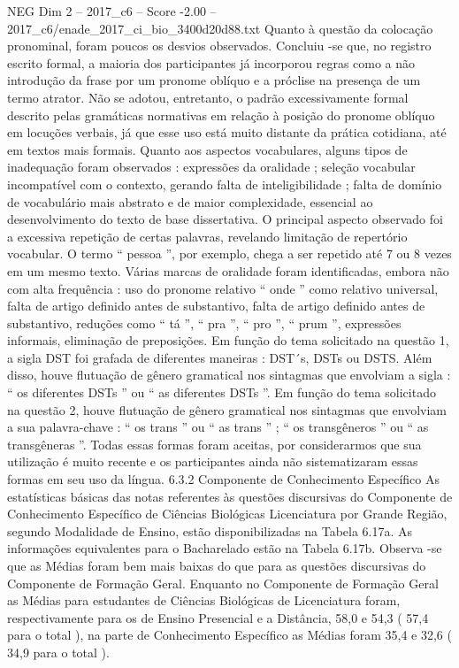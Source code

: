 \begin{textsample}{NEG Dim 2 – 2017\_c6 – Score -2.00 – 2017\_c6/enade\_2017\_ci\_bio\_3400d20d88.txt}
Quanto à questão da colocação pronominal, foram poucos os desvios observados.
Concluiu -se que, no registro escrito formal, a maioria dos participantes já incorporou regras como a não introdução da frase por um pronome oblíquo e a próclise na presença de um termo atrator.
Não se adotou, entretanto, o padrão excessivamente formal descrito pelas gramáticas normativas em relação à posição do pronome oblíquo em locuções verbais, já que esse uso está muito distante da prática cotidiana, até em textos mais formais.
Quanto aos aspectos vocabulares, alguns tipos de inadequação foram observados : expressões da oralidade ; seleção vocabular incompatível com o contexto, gerando falta de inteligibilidade ; falta de domínio de vocabulário mais abstrato e de maior complexidade, essencial ao desenvolvimento do texto de base dissertativa.
O principal aspecto observado foi a excessiva repetição de certas palavras, revelando limitação de repertório vocabular.
O termo “ pessoa ”, por exemplo, chega a ser repetido até 7 ou 8 vezes em um mesmo texto.
Várias marcas de oralidade foram identificadas, embora não com alta frequência : uso do pronome relativo “ onde ” como relativo universal, falta de artigo definido antes de substantivo, falta de artigo definido antes de substantivo, reduções como “ tá ”, “ pra ”, “ pro ”, “ prum ”, expressões informais, eliminação de preposições.
Em função do tema solicitado na questão 1, a sigla DST foi grafada de diferentes maneiras : DST´s, DSTs ou DSTS.
Além disso, houve flutuação de gênero gramatical nos sintagmas que envolviam a sigla : “ os diferentes DSTs ” ou “ as diferentes DSTs ”.
Em função do tema solicitado na questão 2, houve flutuação de gênero gramatical nos sintagmas que envolviam a sua palavra-chave : “ os trans ” ou “ as trans ” ; “ os transgêneros ” ou “ as transgêneras ”.
Todas essas formas foram aceitas, por considerarmos que sua utilização é muito recente e os participantes ainda não sistematizaram essas formas em seu uso da língua. 6.3.2 Componente de Conhecimento Específico As estatísticas básicas das notas referentes às questões discursivas do Componente de Conhecimento Específico de Ciências Biológicas Licenciatura por Grande Região, segundo Modalidade de Ensino, estão disponibilizadas na Tabela 6.17a.
As informações equivalentes para o Bacharelado estão na Tabela 6.17b.
Observa -se que as Médias foram bem mais baixas do que para as questões discursivas do Componente de Formação Geral.
Enquanto no Componente de Formação Geral as Médias para estudantes de Ciências Biológicas de Licenciatura foram, respectivamente para os de Ensino Presencial e a Distância, 58,0 e 54,3 ( 57,4 para o total ), na parte de Conhecimento Específico as Médias foram 35,4 e 32,6 ( 34,9 para o total ).

\end{textsample}
